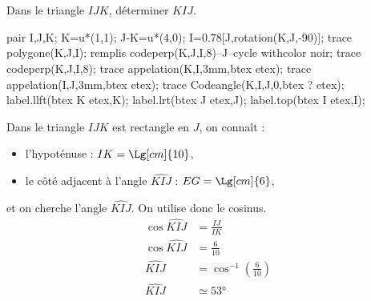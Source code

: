 \begin{methode}
    \exercice    
    Dans le triangle $IJK$, déterminer $\widehat{KIJ}$.\\
    \begin{Geometrie}[CoinHD={(6u,4.5u)}]        
        pair I,J,K;
        K=u*(1,1);
        J-K=u*(4,0);
        I=0.78[J,rotation(K,J,-90)];
        trace polygone(K,J,I);
        remplis codeperp(K,J,I,8)--J--cycle withcolor noir;
        trace codeperp(K,J,I,8);
        trace appelation(K,I,3mm,btex  etex);
        trace appelation(I,J,3mm,btex  etex);                
        trace Codeangle(K,I,J,0,btex ? etex);
        label.llft(btex K etex,K);
        label.lrt(btex J etex,J);
        label.top(btex I etex,I);
    \end{Geometrie}
    \correction
    Dans le triangle $IJK$ est rectangle en $J$, on connaît :
    \begin{itemize}        
        \item l'hypoténuse : $IK=\Lg[cm]{10}$,
        \item le côté adjacent à l'angle $\widehat{KIJ}$ : $EG=\Lg[cm]{6}$,
    \end{itemize}
    et on cherche l'angle $\widehat{KIJ}$. On utilise donc le cosinus.
    \begin{align*}
        \cos\widehat{KIJ}&=\frac{IJ}{IK}\\
        \cos\widehat{KIJ}&=\frac{6}{10}\\
        \widehat{KIJ}&=\cos^{-1}\left(\frac{6}{10}\right)\\
        \widehat{KIJ}&\simeq\ang{53}
    \end{align*}
\end{methode}

